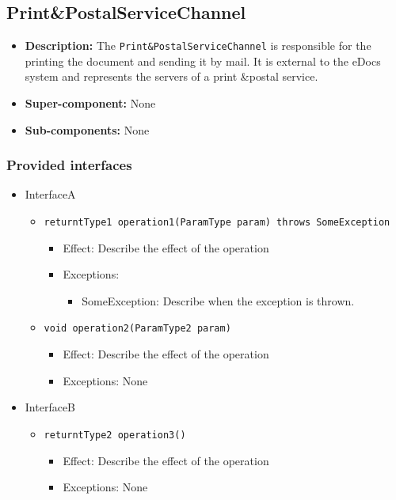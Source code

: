 \documentclass[a4paper,10pt]{article}
\begin{document}
\subsection{Print\&PostalServiceChannel}
\begin{itemize}
    \item \textbf{Description:}  The \texttt{Print\&PostalServiceChannel} is responsible for the printing the document and sending it by mail. It is external to the eDocs system and represents the servers of a print \&postal service.
    \item \textbf{Super-component:} None
    \item \textbf{Sub-components:} None
\end{itemize}

\subsubsection*{Provided interfaces}
\begin{itemize}
    \item InterfaceA
    \begin{itemize}
        \item \texttt{returntType1 operation1(ParamType param) throws SomeException}
        \begin{itemize}
            \item Effect: Describe the effect of the operation
            \item Exceptions:
            \begin{itemize}
                \item SomeException: Describe when the exception is thrown.
            \end{itemize}
		\end{itemize}
        \item \texttt{void operation2(ParamType2 param)}
        \begin{itemize}
            \item Effect: Describe the effect of the operation
            \item Exceptions: None
        \end{itemize}
    \end{itemize}

    \item InterfaceB
    \begin{itemize}
        \item \texttt{returntType2 operation3()}
        \begin{itemize}
            \item Effect: Describe the effect of the operation
            \item Exceptions: None
        \end{itemize}
    \end{itemize}
\end{itemize}
\end{document}
